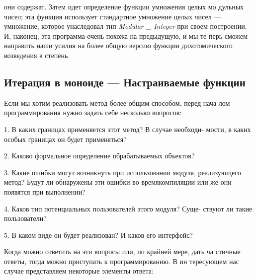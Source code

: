 \noindent они содержат. Затем идет определение функции умножения целых мо­
дульных чисел; эта функция использует стандартное умножение целых
чисел — умножение, которое унаследовал тип {\it Modular \_ Integer} при своем
построении.
И, наконец, эта программа очень похожа на предыдущую, и мы те­
перь сможем направить наши усилия на более общую версию функции
дихотомического возведения в степень.

\subsection{Итерация в моноиде — Настраиваемые функции}


\noindent Если мы хотим реализовать метод более общим способом, перед нача­
лом программирования нужно задать себе несколько вопросов:
\begin{center}
\parbox{12cm}{
1. В каких границах применяется этот метод? В случае необходи­-
   мости, в каких особых границах он будет применяться?

2. Каково формальное определение обрабатываемых объектов?

3. Какие ошибки могут возникнуть при использовании модуля, ре­ализующего метод?           Будут ли обнаружены эти ошибки во времякомпиляции или же они появятся при выполнении?

4. Каков тип потенциальных пользователей этого модуля? Суще­-
   ствуют ли такие пользователи?

5. В каком виде он будет реализован? И каков его интерфейс?
}
\end{center}
Когда можно ответить на эти вопросы или, по крайней мере, дать ча­
стичные ответы, тогда можно приступать к программированию. В ин­
тересующем нас случае представляем некоторые элементы ответа:
